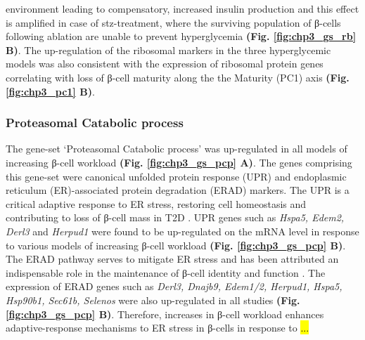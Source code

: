 environment leading to  compensatory, increased insulin production and this effect is amplified in case of \gls{stz}-treatment, where the surviving population of β-cells following ablation are unable to prevent hyperglycemia \textbf{(Fig. \ref{fig:chp3_gs_rb} B)}. The up-regulation of the ribosomal markers in the three hyperglycemic models was also consistent with the expression of ribosomal protein genes correlating with loss of β-cell maturity along the the Maturity (PC1) axis \textbf{(Fig. \ref{fig:chp3_pc1} B)}.

\subsubsection{Proteasomal Catabolic process}
The gene-set `Proteasomal Catabolic process' was up-regulated in all models of increasing β-cell workload \textbf{(Fig. \ref{fig:chp3_gs_pcp} A)}. The genes comprising this gene-set were canonical unfolded protein response (UPR) and endoplasmic reticulum (ER)-associated protein degradation (ERAD) markers. The UPR is a critical adaptive response to ER stress, restoring cell homeostasis and contributing to loss of β-cell mass in T2D \textbf{\cite{oppenlander_vertical_2021,fonseca_endoplasmic_2011,bilekova_pharmacological_2021}}. UPR genes such as \textit{Hspa5, Edem2, Derl3} and \textit{Herpud1} were found to be up-regulated on the mRNA level in response to various models of increasing β-cell workload \textbf{(Fig. \ref{fig:chp3_gs_pcp} B)}. The ERAD pathway serves to mitigate ER stress and has been attributed an indispensable role in the maintenance of β-cell identity and function \textbf{\cite{oppenlander_vertical_2021,hu_endoplasmic_2019,shrestha_sel1l-hrd1_2020}}. The expression of ERAD genes such as \textit{Derl3, Dnajb9, Edem1/2, Herpud1, Hspa5, Hsp90b1, Sec61b, Selenos} were also up-regulated in all studies \textbf{(Fig. \ref{fig:chp3_gs_pcp} B)}. Therefore, increases in β-cell workload enhances adaptive-response mechanisms to ER stress in β-cells in response to \hl{...}

